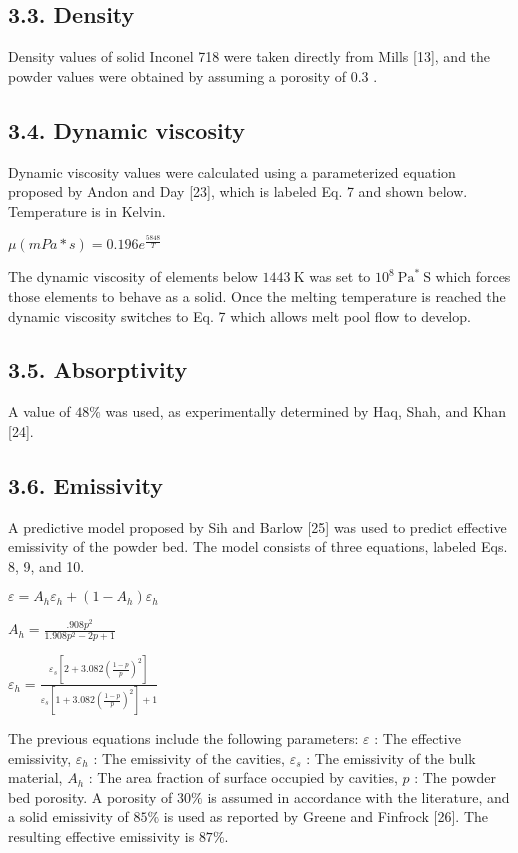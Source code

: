 \documentclass[10pt]{article}
\begin{document}
\subsection*{3.3. Density}
Density values of solid Inconel 718 were taken directly from Mills [13], and the powder values were obtained by assuming a porosity of 0.3 .

\subsection*{3.4. Dynamic viscosity}
Dynamic viscosity values were calculated using a parameterized equation proposed by Andon and Day [23], which is labeled Eq. 7 and shown below. Temperature is in Kelvin.

$\mu(m P a * s)=0.196 e^{\frac{5848}{T}}$

The dynamic viscosity of elements below $1443 \mathrm{~K}$ was set to $10^{8} \mathrm{~Pa}^{*} \mathrm{~S}$ which forces those elements to behave as a solid. Once the melting temperature is reached the dynamic viscosity switches to Eq. 7 which allows melt pool flow to develop.

\subsection*{3.5. Absorptivity}
A value of $48 \%$ was used, as experimentally determined by Haq, Shah, and Khan [24].

\subsection*{3.6. Emissivity}
A predictive model proposed by Sih and Barlow [25] was used to predict effective emissivity of the powder bed. The model consists of three equations, labeled Eqs. 8, 9, and 10.

$\varepsilon=A_{h} \varepsilon_{h}+\left(1-A_{h}\right) \varepsilon_{h}$

$A_{h}=\frac{.908 p^{2}}{1.908 p^{2}-2 p+1}$

$\varepsilon_{h}=\frac{\varepsilon_{s}\left[2+3.082\left(\frac{1-p}{p}\right)^{2}\right]}{\varepsilon_{s}\left[1+3.082\left(\frac{1-p}{p}\right)^{2}\right]+1}$

The previous equations include the following parameters: $\varepsilon$ : The effective emissivity, $\varepsilon_{h}$ : The emissivity of the cavities, $\varepsilon_{s}$ : The emissivity of the bulk material, $A_{h}$ : The area fraction of surface occupied by cavities, $p$ : The powder bed porosity. A porosity of $30 \%$ is assumed in accordance with the literature, and a solid emissivity of $85 \%$ is used as reported by Greene and Finfrock [26]. The resulting effective emissivity is $87 \%$.
\end{document}
